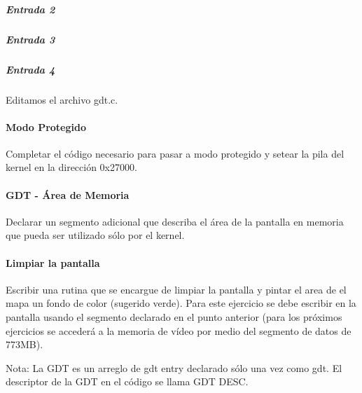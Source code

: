 \subparagraph*{Entrada 2}

\subparagraph*{Entrada 3}

\subparagraph*{Entrada 4}



Editamos el archivo gdt.c.

\paragraph{Modo Protegido}\label{subsubsec:ej1-b}
Completar el código necesario para pasar a modo protegido y setear la pila del
kernel en la dirección 0x27000.
\hruler
{}

\paragraph{GDT - Área de Memoria}\label{subsubsec:ej1-c}
Declarar un segmento adicional que describa el área de la pantalla en memoria
que pueda ser utilizado sólo por el kernel.
\hruler
{}

\paragraph{Limpiar la pantalla}\label{subsubsec:ej1-d}
Escribir una rutina que se encargue de limpiar la pantalla y pintar el area de
el mapa un fondo de color (sugerido verde). Para este ejercicio se debe escribir
en la pantalla usando el segmento declarado en el punto anterior (para los
próximos ejercicios se accederá a la memoria de vídeo por medio del segmento de
datos de 773MB).

Nota: La GDT es un arreglo de gdt entry declarado sólo una vez como gdt. El
descriptor de la GDT en el código se llama GDT DESC.
\hruler
{}